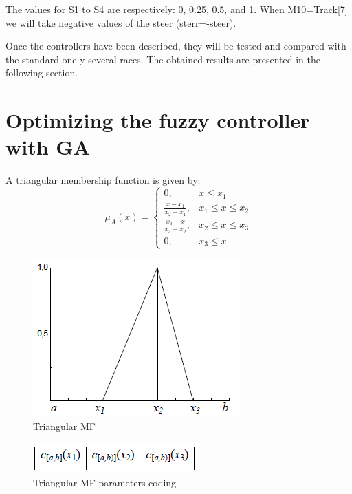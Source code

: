 \documentclass[runningheads,a4paper]{llncs}
\begin{document}
	The values for S1 to S4 are respectively: 0, 0.25, 0.5, and 1.
	When M10=Track[7] we will take negative values of the steer (sterr=-steer).
	
	Once the controllers have been described, they will be tested and compared with the standard one y several races. The obtained results are presented in the following section.
	
	
\section{Optimizing the fuzzy controller with GA}

A triangular membership function is given by:
\begin{equation} 
\mu_{A}(x)= \left \{
\begin{array}{ll}
0, & x \leq x_{1}\\
\frac{x - x_{1}}{x_{2} - x_{1}}, &x_{1} \leq x \leq x_{2}  \\
\frac{x_{3} - x}{x_{3} - x_{2}}, &x_{2} \leq x \leq x_{3}  \\
0,& x_{3} \leq x 
\end{array}
\right.
\end{equation}

\begin{figure}[!h]
	\begin{center}
		\includegraphics[scale=0.90]{fig/triangulaire}
		\caption {Triangular MF}
		\label{tri}
	\end{center}
\end{figure}


\begin{figure}[!h]
	\begin{center}
		\includegraphics[scale=0.95]{fig/codage}
		\caption {Triangular MF parameters coding}
		\label{co} 
	\end{center}
\end{figure}
\end{document}
